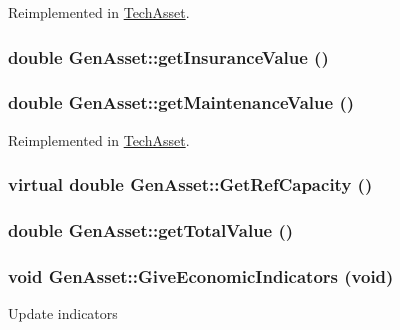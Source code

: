Reimplemented in \hyperlink{class_tech_asset_ac855fd27bd197ef63d91588fcd7416c5}{TechAsset}.\hypertarget{class_gen_asset_a2674387e6472f710910681e235a09c0c}{
\subsubsection[{getInsuranceValue}]{\setlength{\rightskip}{0pt plus 5cm}double GenAsset::getInsuranceValue ()}}
\label{class_gen_asset_a2674387e6472f710910681e235a09c0c}
\hypertarget{class_gen_asset_a702f6a8396de589c119a24aede39a930}{
\subsubsection[{getMaintenanceValue}]{\setlength{\rightskip}{0pt plus 5cm}double GenAsset::getMaintenanceValue ()}}
\label{class_gen_asset_a702f6a8396de589c119a24aede39a930}


Reimplemented in \hyperlink{class_tech_asset_a72e1db80b26fc920318a3f98ec814b06}{TechAsset}.\hypertarget{class_gen_asset_ae5ee931a4a3e161320e83f8338ae79e9}{
\subsubsection[{GetRefCapacity}]{\setlength{\rightskip}{0pt plus 5cm}virtual double GenAsset::GetRefCapacity ()}}
\label{class_gen_asset_ae5ee931a4a3e161320e83f8338ae79e9}
\hypertarget{class_gen_asset_a1e42b862553dca959bb6528a0413b321}{
\subsubsection[{getTotalValue}]{\setlength{\rightskip}{0pt plus 5cm}double GenAsset::getTotalValue ()}}
\label{class_gen_asset_a1e42b862553dca959bb6528a0413b321}
\hypertarget{class_gen_asset_a278eca323c1cf1bace458cda1103ac15}{
\subsubsection[{GiveEconomicIndicators}]{\setlength{\rightskip}{0pt plus 5cm}void GenAsset::GiveEconomicIndicators (void)}}
\label{class_gen_asset_a278eca323c1cf1bace458cda1103ac15}
Update indicators 

